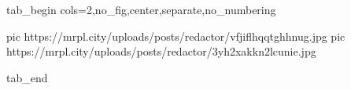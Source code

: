  
 
 
 
 

\ifcmt
  tab_begin cols=2,no_fig,center,separate,no_numbering

     pic https://mrpl.city/uploads/posts/redactor/vfjiflhqqtghhnug.jpg
		 pic https://mrpl.city/uploads/posts/redactor/3yh2xakkn2lcunie.jpg

  tab_end
\fi
